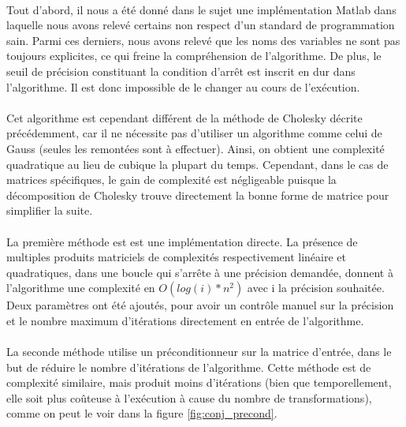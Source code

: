 \documentclass{article}
\begin{document}
\paragraph{}
    Tout d'abord, il nous a été donné dans le sujet une implémentation Matlab dans laquelle nous avons relevé certains non respect d'un standard de programmation sain. Parmi ces derniers, nous avons relevé que les noms des variables ne sont pas toujours explicites, ce qui freine la compréhension de l'algorithme. De plus, le seuil de précision constituant la condition d'arrêt est inscrit en dur dans l'algorithme. Il est donc impossible de le changer au cours de l'exécution.
    
\paragraph{}
    Cet algorithme est cependant différent de la méthode de Cholesky décrite précédemment, car il ne nécessite pas d'utiliser un algorithme comme celui de Gauss (seules les remontées sont à effectuer). Ainsi, on obtient une complexité quadratique au lieu de cubique la plupart du temps. Cependant, dans le cas de matrices spécifiques, le gain de complexité est négligeable puisque la décomposition de Cholesky trouve directement la bonne forme de matrice pour simplifier la suite.

\paragraph{}
    La première méthode est est une implémentation directe. La présence de multiples produits matriciels de complexités respectivement linéaire et quadratiques, dans une boucle qui s'arrête à une précision demandée, donnent à l'algorithme une complexité en $O(log(i)*n^2)$ avec i la précision souhaitée. Deux paramètres ont été ajoutés, pour avoir un contrôle manuel sur la précision et le nombre maximum d'itérations directement en entrée de l'algorithme. 
    
\paragraph{}
    La seconde méthode utilise un préconditionneur sur la matrice d'entrée, dans le but de réduire le nombre d'itérations de l'algorithme. Cette méthode est de complexité similaire, mais produit moins d'itérations (bien que temporellement, elle soit plus coûteuse à l'exécution à cause du nombre de transformations), comme on peut le voir dans la figure \ref{fig:conj_precond}. 
    
\end{document}
